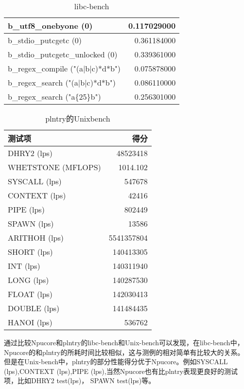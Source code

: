 \begin{table}[H]
\begin{tabular}{|l|r|}
        \hline
        b\_utf8\_onebyone (0) & 0.117029000 \\
        \hline
        b\_stdio\_putcgetc (0) & 0.361184000 \\
        \hline
        b\_stdio\_putcgetc\_unlocked (0) & 0.339361000 \\
        \hline
        b\_regex\_compile ("(a|b|c)*d*b") & 0.075878000 \\
        \hline
        b\_regex\_search ("(a|b|c)*d*b") & 0.086110000 \\
        \hline
        b\_regex\_search ("a\{25\}b") & 0.256301000 \\
        \hline
    \end{tabular}
    \caption{libc-bench}
\end{table}

\begin{table}[H]
    \centering
    \begin{tabular}{|l|r|}
    \hline
        测试项 & 得分 \\
        \hline
        DHRY2 (lps) & 48523418 \\
        \hline
        WHETSTONE (MFLOPS) & 1014.102 \\
        \hline
        SYSCALL (lps) & 547678 \\
        \hline
        CONTEXT (lps) & 42416 \\
        \hline
        PIPE (lps) & 802449 \\
        \hline
        SPAWN (lps) & 13586 \\
        \hline
        ARITHOH (lps) & 5541357804 \\
        \hline
        SHORT (lps) & 140413305 \\
        \hline
        INT (lps) & 140311940 \\
        \hline
        LONG (lps) & 140287530 \\
        \hline
        FLOAT (lps) & 142030413 \\
        \hline
        DOUBLE (lps) & 141484435 \\
        \hline
        HANOI (lps) & 536762 \\
    \hline
    \end{tabular}
    \caption{plntry的Unixbench}
    \label{tab:unixbench}
\end{table}

通过比较Npucore和plntry的libc-bench和Unix-bench可以发现，在libc-bench中，Npucore的和plntry的所耗时间比较相似，这与测例的相对简单有比较大的关系。但是在Unix-bench中，plntry的部分性能得分优于Npucore。例如SYSCALL (lps),CONTEXT (lps),PIPE (lps),当然Npucore也有比plntry表现更良好的测试项，比如DHRY2 test(lps)， SPAWN test(lps)等。

